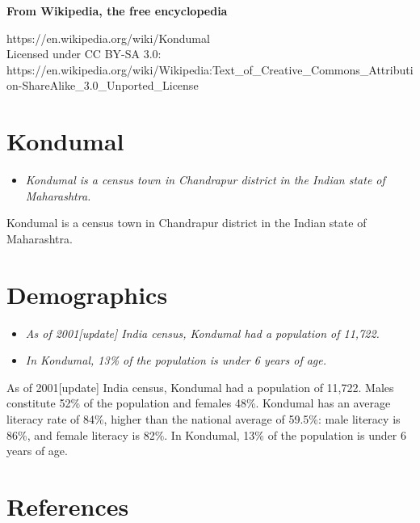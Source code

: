 \textbf{From Wikipedia, the free encyclopedia}

https://en.wikipedia.org/wiki/Kondumal\\
Licensed under CC BY-SA 3.0:\\
https://en.wikipedia.org/wiki/Wikipedia:Text\_of\_Creative\_Commons\_Attribution-ShareAlike\_3.0\_Unported\_License

\section{Kondumal}\label{kondumal}

\begin{itemize}
\item
  \emph{Kondumal is a census town in Chandrapur district in the Indian
  state of Maharashtra.}
\end{itemize}

Kondumal is a census town in Chandrapur district in the Indian state of
Maharashtra.

\section{Demographics}\label{demographics}

\begin{itemize}
\item
  \emph{As of 2001{[}update{]} India census, Kondumal had a population
  of 11,722.}
\item
  \emph{In Kondumal, 13\% of the population is under 6 years of age.}
\end{itemize}

As of 2001{[}update{]} India census, Kondumal had a population of
11,722. Males constitute 52\% of the population and females 48\%.
Kondumal has an average literacy rate of 84\%, higher than the national
average of 59.5\%: male literacy is 86\%, and female literacy is 82\%.
In Kondumal, 13\% of the population is under 6 years of age.

\section{References}\label{references}
